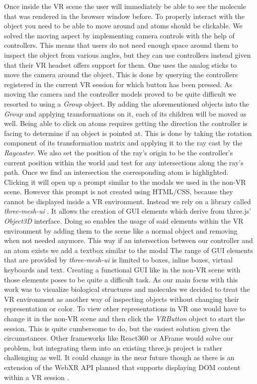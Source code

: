 Once inside the VR scene the user will immediately be able to see the molecule that was rendered in the browser window before. To properly interact with the object you need to be able to move around and atoms should be clickable. We solved the moving aspect by implementing camera controls with the help of controllers. This means that users do not need enough space around them to inspect the object from various angles, but they can use controllers instead given that their VR headset offers support for them. One uses the analog sticks to move the camera around the object. This is done by querying the controllers registered in the current VR session for which button has been pressed. As moving the camera and the controller models proved to be quite difficult we resorted to using a \textit{Group} object. By adding the aforementioned objects into the \textit{Group} and applying transformations on it, each of its children will be moved as well. Being able to click on atoms requires getting the direction the controller is facing to determine if an object is pointed at. This is done by taking the rotation component of its transformation matrix and applying it to the ray cast by the \textit{Raycaster}. We also set the position of the ray's origin to be the controller's current position within the world and test for any intersections along the ray's path. Once we find an intersection the corresponding atom is highlighted. Clicking it will open up a prompt similar to the modals we used in the non-VR scene. However this prompt is not created using HTML/CSS, because they cannot be displayed inside a VR environment. Instead we rely on a library called \textit{three-mesh-ui} \cite{felixmariotto2022Oct}. It allows the creation of GUI elements which derive from three.js' \textit{Object3D} interface. Doing so enables the usage of said elements within the VR environment by adding them to the scene like a normal object and removing when not needed anymore. This way if an intersection between our controller and an atom exists we add a textbox similar to the modal  The range of GUI elements that are provided by \textit{three-mesh-ui} is limited to boxes, inline boxes, virtual keyboards and text. Creating a functional GUI like in the non-VR scene with those elements poses to be quite a difficult task. As our main focus with this work was to visualize biological structures and molecules we decided to treat the VR environment as another way of inspecting objects without changing their representation or color. To view other representations in VR one would have to change it in the non-VR scene and then click the \textit{VRButton} object to start the session. This is quite cumbersome to do, but the easiest solution given the circumstances. Other frameworks like React360 \cite{facebookarchive2022Oct} or AFrame \cite{aframe} would solve our problem, but integrating them into an existing three.js project is rather challenging as well. It could change in the near future though as there is an extension of the WebXR API planned that supports displaying DOM content within a VR session \cite{immersive-web2022Oct}.